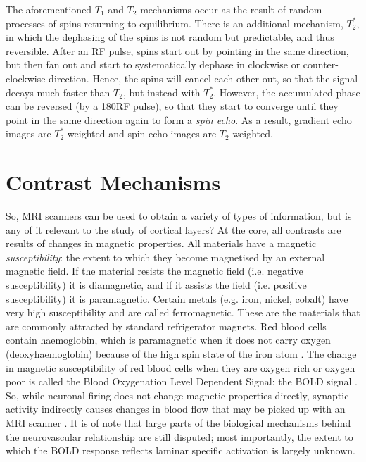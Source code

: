 The aforementioned $T_1$ and $T_2$ mechanisms occur as the result of random processes of spins returning to equilibrium. There is an additional mechanism, $T_2^*$, in which the dephasing of the spins is not random but predictable, and thus reversible. After an RF pulse, spins start out by pointing in the same direction, but then fan out and start to systematically dephase in clockwise or counter-clockwise direction. Hence, the spins will cancel each other out, so that the signal decays much faster than $T_2$, but instead with $T_2^*$. However, the accumulated phase can be reversed (by a 180\textdegree RF pulse), so that they start to converge until they point in the same direction again to form a \emph{spin echo}. As a result, gradient echo images are $T_2^*$-weighted and spin echo images are $T_2$-weighted.

\section*{Contrast Mechanisms}
So, MRI scanners can be used to obtain a variety of types of information, but is any of it relevant to the study of cortical layers? At the core, all contrasts are results of changes in magnetic properties. All materials have a magnetic \emph{susceptibility}: the extent to which they become magnetised by an external magnetic field. If the material resists the magnetic field (i.e. negative susceptibility) it is diamagnetic, and if it assists the field (i.e. positive susceptibility) it is paramagnetic. Certain metals (e.g. iron, nickel, cobalt) have very high susceptibility and are called ferromagnetic. These are the materials that are commonly attracted by standard refrigerator magnets. Red blood cells contain haemoglobin, which is paramagnetic when it does not carry oxygen (deoxyhaemoglobin) because of the high spin state of the iron atom \cite{Pauling1936}. The change in magnetic susceptibility of red blood cells when they are oxygen rich or oxygen poor is called the Blood Oxygenation Level Dependent Signal: the BOLD signal \cite{Ogawa1990}. So, while neuronal firing does not change magnetic properties directly, synaptic activity indirectly causes changes in blood flow that may be picked up with an MRI scanner \cite{Logothetis2006}. It is of note that large parts of the biological mechanisms behind the neurovascular relationship are still disputed; most importantly, the extent to which the BOLD response reflects laminar specific activation is largely unknown.

